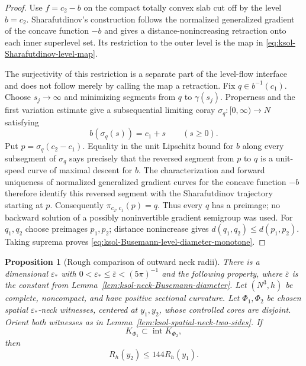 \documentclass[10pt]{coll-l}
\newtheorem{proposition}[theorem]{Proposition}
\theoremstyle{definition}
\theoremstyle{remark}
\numberwithin{section}{chapter}
\numberwithin{equation}{chapter}
\begin{document}
\begin{proof}
Use $f=c_2-b$ on the compact totally convex slab cut off by the level
$b=c_2$.  Sharafutdinov's construction follows the normalized generalized
gradient of the concave function $-b$ and gives a distance-nonincreasing
retraction onto each inner superlevel set.  Its restriction to the outer
level is the map in \eqref{eq:ksol-Sharafutdinov-level-map}.

The surjectivity of this restriction is a separate part of the level-flow
interface and does not follow merely by calling the map a retraction.  Fix
$q\in b^{-1}(c_1)$.  Choose $s_j\to\infty$ and minimizing segments from
$q$ to $\gamma(s_j)$.  Properness and the first variation estimate give a
subsequential limiting coray $\sigma_q:[0,\infty)\to N$ satisfying
\begin{equation}
             b(\sigma_q(s))=c_1+s\qquad(s\geq0).      \label{eq:ksol-coray-linear-busemann}
\end{equation}
Put $p=\sigma_q(c_2-c_1)$.  Equality in the unit Lipschitz bound for $b$
along every subsegment of $\sigma_q$ says precisely that the reversed
segment from $p$ to $q$ is a unit-speed curve of maximal descent for $b$.
The characterization and forward uniqueness of normalized generalized
gradient curves for the concave function $-b$ therefore identify this
reversed segment with the Sharafutdinov trajectory starting at $p$.
Consequently $\pi_{c_2,c_1}(p)=q$.  Thus every $q$ has a preimage; no
backward solution of a possibly noninvertible gradient semigroup was used.
For
$q_1,q_2$ choose preimages $p_1,p_2$; distance nonincrease gives
$d(q_1,q_2)\leq d(p_1,p_2)$.  Taking suprema proves
\eqref{eq:ksol-Busemann-level-diameter-monotone}.
\end{proof}

\begin{proposition}[Rough comparison of outward neck radii]
\label{prop:ksol-outward-neck-comparison}
There is a dimensional $\varepsilon_*$ with
$0<\varepsilon_*\leq\bar\varepsilon<(5\pi)^{-1}$ and the following
property, where $\bar\varepsilon$ is the constant from
Lemma~\ref{lem:ksol-neck-Busemann-diameter}.  Let
$(N^3,h)$ be complete, noncompact, and have positive sectional curvature.
Let $\Phi_1,\Phi_2$ be chosen spatial $\varepsilon_*$-neck witnesses,
centered at $y_1,y_2$, whose controlled cores are disjoint.  Orient both
witnesses as in Lemma~\ref{lem:ksol-spatial-neck-two-sides}.  If
\begin{equation}
              K_{\Phi_1}\subset\operatorname{int}K_{\Phi_2},  \label{eq:ksol-neck-outward-order}
\end{equation}
then
\begin{equation}
                            R_h(y_2)\leq144R_h(y_1).    \label{eq:ksol-neck-radius-comparison}
\end{equation}
\end{proposition}
\end{document}
